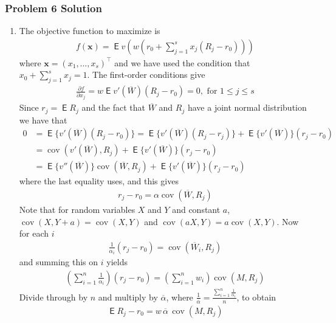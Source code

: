 \documentclass[10pt,handout]{beamer}
\newcommand{\ds}{\displaystyle}
\DeclareMathOperator\expc{\mathsf{E}}
\DeclareMathOperator\cov{cov}
\theoremstyle{definition}
\begin{document}
\begin{frame}[allowframebreaks]
  \frametitle{Problem 6 Solution}
  \begin{enumerate}
    \item The objective function to maximize is
      \begin{align*}
        f(\mathbf{x}) = \expc v\left(w\left(r_0 + \sum_{j=1}^s x_j(R_j - r_0)\right)\right)
      \end{align*}
      where $\mathbf{x} = (x_1,\ldots,x_s)^\top$ and we have used the condition that $x_0 + \sum_{j=1}^s x_j = 1$. The first-order conditions give
      \begin{align*}
        \frac{\partial f}{\partial x_j} = w\expc{v'(\overline{W})(R_j - r_0)} = 0, \text{ for } 1 \leqslant j \leqslant s
      \end{align*}
      Since $r_j = \expc{R_j}$ and the fact that $\overline{W}$ and $R_j$ have a joint normal distribution we have that
      \begin{align*}
        0 &= \expc\big\{v'(\overline{W})(R_j - r_0)\big\} = \expc\big\{v'(\overline{W})(R_j - r_j)\big\} + \expc\big\{v'(\overline{W})\big\}(r_j - r_0) \\
          &= \cov(v'(\overline{W}), R_j) + \expc\big\{v'(\overline{W})\big\}(r_j - r_0) \\
          &= \expc\big\{v''(\overline{W})\big\}\cov(\overline{W}, R_j) + \expc\big\{v'(\overline{W})\big\}(r_j - r_0)
        \end{align*}
      where the last equality uses, and this gives
      \begin{align*}
        r_j - r_0 = \alpha \cov(\overline{W}, R_j)
      \end{align*}
      Note that for random variables $X$ and $Y$ and constant $a$, $\cov(X, Y + a) = \cov(X, Y)$ and $\cov(aX, Y) = a\cov(X,Y)$. Now for each $i$
      \begin{align*}
        \frac{1}{\alpha_i}(r_j - r_0) = \cov(\overline{W}_i, R_j)
      \end{align*}
      and summing this on $i$ yields
      \begin{align*}
        \left(\sum_{i=1}^n\frac{1}{\alpha_i}\right)(r_j - r_0) = \left(\sum_{i=1}^n w_i\right)\cov(M, R_j)
      \end{align*}
      Divide through by $n$ and multiply by $\overline{\alpha}$, where $\ds\frac{1}{\overline{\alpha}} = \frac{\sum_{i=1}^n\frac{1}{\alpha_i}}{n}$, to obtain
      \begin{align}\label{eq:m0}
        \expc{R_j} - r_0 = w\,\overline{\alpha}\,\cov(M, R_j)

\end{align}
\end{enumerate}
\end{frame}
\end{document}
